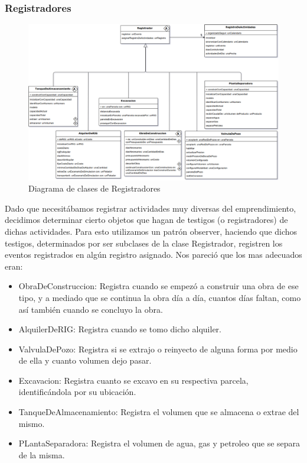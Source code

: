 \documentclass[10pt,a4paper]{article}
\begin{document}
\pagebreak

\subsubsection{Registradores}

\begin{figure}[H]
\centerline{\includegraphics[scale=0.44]{images/DiagramaDeClases_deRegistrador.png}}
\caption{Diagrama de clases de Registradores}
\end{figure}

  Dado que necesitábamos registrar actividades muy diversas del emprendimiento, decidimos determinar cierto objetos que hagan de testigos (o registradores) de dichas actividades. Para esto utilizamos un patrón observer, haciendo que dichos testigos, determinados por ser subclases de la clase Registrador, registren los eventos registrados en algún registro asignado. Nos pareció que los mas adecuados eran:
  
  \begin{itemize}
  
  \item ObraDeConstruccion: Registra cuando se empezó a construir una obra de ese tipo, y a mediado que se continua la obra día a día, cuantos días faltan, como así también cuando se concluyo la obra. 
  
  \item AlquilerDeRIG: Registra cuando se tomo dicho alquiler.
  
  \item ValvulaDePozo: Registra si se extrajo o reinyecto de alguna forma por medio de ella y cuanto volumen dejo pasar.
  
  \item Excavacion: Registra cuanto se excavo en su respectiva parcela, identificándola por su ubicación.
  
  \item TanqueDeAlmacenamiento: Registra el volumen que se almacena o extrae del mismo.
  
  \item PLantaSeparadora: Registra el volumen de agua, gas y petroleo que se separa de la misma.

  \end{itemize}
  
\end{document}
